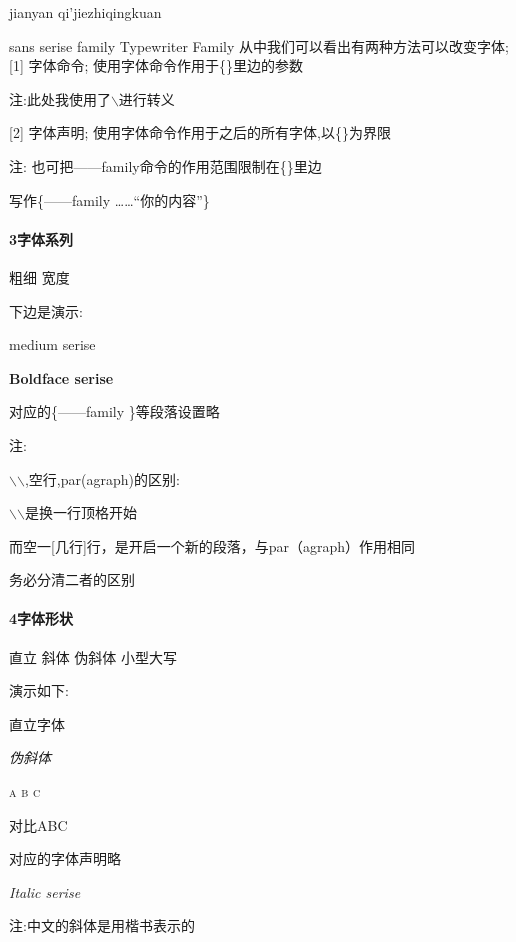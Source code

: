 \documentclass[fontset=windows]{article}
\begin{document}
    jianyan qi'jiezhiqingkuan

    {\sffamily sans serise family} {\ttfamily Typewriter Family}
    从中我们可以看出有两种方法可以改变字体;
    [1] 字体命令; 使用字体命令作用于\{\}里边的参数

    注:此处我使用了$\backslash$进行转义

    [2] 字体声明; 使用字体命令作用于之后的所有字体,以\{\}为界限

    注: 也可把——family命令的作用范围限制在\{\}里边

    写作\{——family  ……“你的内容”\}

    \paragraph{3字体系列}
    粗细
    宽度

    下边是演示:

    \textmd{medium serise}

    \textbf{Boldface serise}

    对应的\{——family  \}等段落设置略

    注:

    $\backslash$$\backslash$,空行,par(agraph)的区别:

    $\backslash$$\backslash$是换一行顶格开始

    而空一[几行]行，是开启一个新的段落，与par（agraph）作用相同

    务必分清二者的区别


    \paragraph{4字体形状}
    直立
    斜体
    伪斜体
    小型大写

    演示如下:

    \textup{直立字体}

    \textsl{伪斜体}

    \textsc{a b c}

    对比ABC

    对应的字体声明略

    \textit{Italic serise}




    注:中文的斜体是用楷书表示的
\end{document}
